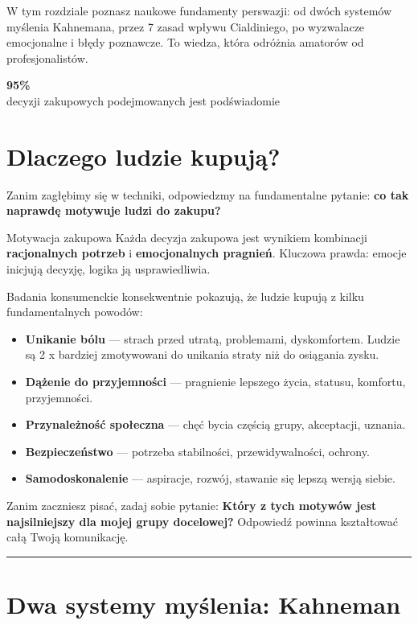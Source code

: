 \documentclass[
  12pt,
  a4paper,
  twoside,
  openright,
  12pt,
  DIV=12,
  BCOR=12mm]{scrbook}
\newcommand{\decoline}{%
  \begin{center}
    \textcolor{bordergray}{\rule{0.3\textwidth}{0.5pt}}
  \end{center}
}
\newcommand{\stathighlight}[2]{%
  \begin{center}
    \begin{tcolorbox}[
      enhanced,
      colback=primarylight,
      colframe=primaryblue,
      boxrule=1pt,
      arc=5pt,
      width=0.6\textwidth,
      halign=center
    ]
      {\fontsize{36}{40}\selectfont\bfseries\color{primarydark}#1}\\[5pt]
      {\color{textmuted}#2}
    \end{tcolorbox}
  \end{center}
}
\begin{document}
W tym rozdziale poznasz naukowe fundamenty perswazji: od dwóch systemów
myślenia Kahnemana, przez 7 zasad wpływu Cialdiniego, po wyzwalacze
emocjonalne i błędy poznawcze. To wiedza, która odróżnia amatorów od
profesjonalistów.

\stathighlight{95\%}{decyzji zakupowych podejmowanych jest podświadomie}

\section{Dlaczego ludzie kupują?}\label{dlaczego-ludzie-kupujux105}

Zanim zagłębimy się w techniki, odpowiedzmy na fundamentalne pytanie:
\textbf{co tak naprawdę motywuje ludzi do zakupu?}

\begin{pojecie}{Motywacja zakupowa}
Każda decyzja zakupowa jest wynikiem kombinacji \textbf{racjonalnych potrzeb} i \textbf{emocjonalnych pragnień}. Kluczowa prawda: emocje inicjują decyzję, logika ją usprawiedliwia.
\end{pojecie}

Badania konsumenckie konsekwentnie pokazują, że ludzie kupują z kilku
fundamentalnych powodów:

\begin{itemize}
\item
  \textbf{Unikanie bólu} --- strach przed utratą, problemami,
  dyskomfortem. Ludzie są 2 x bardziej zmotywowani do unikania straty
  niż do osiągania zysku.
\item
  \textbf{Dążenie do przyjemności} --- pragnienie lepszego życia,
  statusu, komfortu, przyjemności.
\item
  \textbf{Przynależność społeczna} --- chęć bycia częścią grupy,
  akceptacji, uznania.
\item
  \textbf{Bezpieczeństwo} --- potrzeba stabilności, przewidywalności,
  ochrony.
\item
  \textbf{Samodoskonalenie} --- aspiracje, rozwój, stawanie się lepszą
  wersją siebie.
\end{itemize}

\begin{wskazowka}
Zanim zaczniesz pisać, zadaj sobie pytanie: \textbf{Który z tych motywów jest najsilniejszy dla mojej grupy docelowej?} Odpowiedź powinna kształtować całą Twoją komunikację.
\end{wskazowka}

\decoline

\section{Dwa systemy myślenia:
Kahneman}\label{dwa-systemy-myux15blenia-kahneman}
\end{document}
